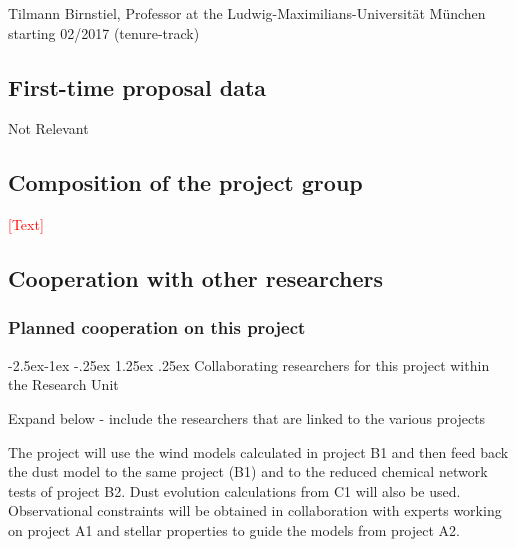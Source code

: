\documentclass[10pt,fleqn,twoside]{article}
\makeatletter
\newcommand{\Tcol}{\color{blue}}
\renewcommand\paragraph{\@startsection{paragraph}{4}{\z@}%
            {-2.5ex\@plus -1ex \@minus -.25ex}%
            {1.25ex \@plus .25ex}%
            {\normalfont\normalsize\bfseries}}
\makeatother
\begin{document}
Tilmann Birnstiel, Professor at the Ludwig-Maximilians-Universit\"at M\"unchen starting 02/2017  (tenure-track)

\subsection{\Tcol First-time proposal data}

Not Relevant

\subsection{\Tcol Composition of the project group}

\textcolor{red}{[Text]}

\subsection{\Tcol Cooperation with other researchers}

\subsubsection{\Tcol Planned cooperation on this project}

\paragraph{\Tcol Collaborating researchers for this project within the
  Research Unit}

{\color{red} Expand below - include the researchers that are linked to
  the various projects}

The project will use the wind models calculated in project B1 and then
feed back the dust model to the same project (B1) and to the reduced
chemical network tests of project B2. Dust evolution calculations from C1 will also be used. Observational constraints will
be obtained in collaboration with experts working on project A1 and
stellar properties to guide the models 
from project A2. 
\end{document}
